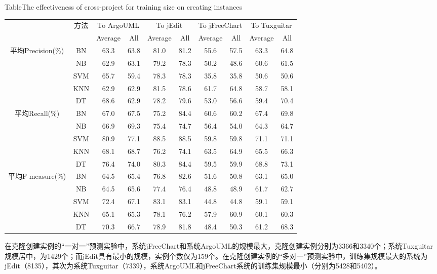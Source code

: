 \begin{table} [h]
{Table$\!$}{The effectiveness of cross-project for training size on creating instances}
\vspace{0.5em}
\centering
\footnotesize
\begin{tabular}{cccccccccc}
\toprule[1.5pt]
~\multirow{2}{*}{指标}&\multirow{2}{*}{方法}&\multicolumn{2}{c}{To ArgoUML}&\multicolumn{2}{c}{To jEdit}&\multicolumn{2}{c}{To jFreeChart}&\multicolumn{2}{c}{To  Tuxguitar}\\
\cline{3-10}
~&~&{Average}&{All}&{Average}&{All}&{Average}&{All}&{Average}&{All}\\
\midrule[1pt]
\multirow{5}{*}{平均Precision(\%)}
&BN&63.3&63.8&81.0&81.2&55.6&57.5&63.3&64.8\\
&NB&62.9&63.1&79.2&78.3&50.2&48.6&60.6&61.5\\
&SVM&65.7&59.4&78.3&78.3&35.8&35.8&50.6&50.6\\
&KNN&62.9&62.9&81.5&78.6&	61.7&64.8&58.7&58.1\\
&DT&68.6&62.9&78.2&79.6&	53.0&56.6&59.4&70.4\\
\hline
\multirow{5}{*}{平均Recall(\%)}															
&BN&67.0&67.5&75.2&84.4&60.6&60.2&67.4&69.8\\
&NB&66.9&69.3&75.4&74.7&56.4&54.0&64.3&64.7\\
&SVM&80.9&77.1&88.5&88.5&59.8&59.8&71.1&71.1\\
&KNN&68.1&68.7&76.2&74.1&63.5&64.9&65.5&66.3\\
&DT	&76.4&74.0&80.3&84.4&59.5&59.9&68.8&73.1\\
\hline
\multirow{5}{*}{平均F-measure(\%)}					
&BN&64.5&65.4&76.8&82.6&51.6&50.8&63.1&65.0\\
&NB&64.5&65.6&77.4&76.4&48.8&48.9&61.7&62.7\\
&SVM&72.4&67.1&83.1&83.1&44.8&44.8&59.1&59.1\\
&KNN&65.1&65.3&78.1&76.2&57.9&60.9&60.1&60.3\\
&DT	&70.3&66.7&78.9&81.8&48.4&50.3&61.2&68.3\\
\bottomrule[1.5pt]
\end{tabular}
\end{table}

在克隆创建实例的“一对一”预测实验中，系统jFreeChart和系统ArgoUML的规模最大，克隆创建实例分别为3366和3340个；系统Tuxguitar规模居中，为1429个；而jEdit具有最小的规模，实例个数仅为159个。在克隆创建实例的“多对一”预测实验中，训练集规模最大的系统为jEdit（8135），其次为系统Tuxguitar（7339），系统ArgoUML和jFreeChart系统的训练集规模最小（分别为5428和5402）。

